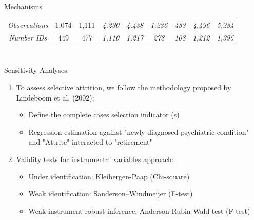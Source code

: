 \documentclass{beamer}
\begin{document}
\begin{frame}{Mechanisms}
\begin{table}[h]
{\begin{tabular}{@{}ccccccccc@{}}
\textit{Observations} & 1,074 & 1,111 & \textit{4,230} & \textit{4,438} & \textit{1,236} & \textit{483} & \textit{4,496} & \textit{5,284} \\
\textit{Number IDs} & 449 & 477 & \textit{1,110} & \textit{1,217} & \textit{278} & \textit{108} & \textit{1,212} & \textit{1,395} \\ \bottomrule
\end{tabular}%
}
\end{table}
\end{frame}

\section*{}
\begin{frame}{Sensitivity Analyses}
\footnotesize
    \begin{enumerate}
        \item<1-> To assess \begingroup\color{Blue}selective attrition\endgroup, we follow the methodology proposed by \scriptsize{\begingroup\color{lightgray}Lindeboom et al. (2002)\endgroup}:

        \begin{itemize}
        \scriptsize
            \item<2-> Define the complete cases \begingroup\color{Blue} selection indicator (s)\endgroup
             \item<3-> Regression estimation against "newly diagnosed psychiatric condition" and "Attrite" interacted to "retirement"
        \end{itemize}
        
        

        \item<4-> \begingroup\color{Blue}Validity tests  \endgroup for instrumental variables approach: 
        \begin{itemize}
             \scriptsize
            \item<5-> Under identification: Kleibergen-Paap (Chi-square)
            \item<6-> Weak identification: Sanderson–Windmeijer (F-test)
            \item<7-> Weak-instrument-robust inference: Anderson-Rubin Wald test (F-test)
        \end{itemize}


\end{enumerate}
\end{frame}
\end{document}
